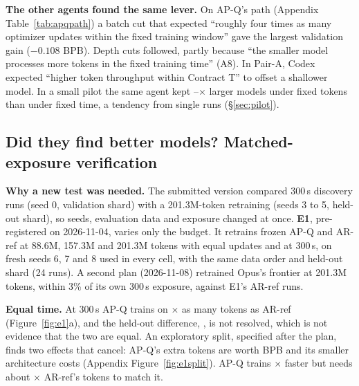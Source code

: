 \documentclass{article}
\begin{document}
\textbf{The other agents found the same lever.} On AP-Q's path (Appendix Table~\ref{tab:apqpath}) a batch cut that expected ``roughly four times as many optimizer updates within the fixed training window'' gave the largest validation gain ($-0.108$ BPB). Depth cuts followed, partly because ``the smaller model processes more tokens in the fixed training time'' (A8). In Pair-A, Codex expected ``higher token throughput within Contract T'' to offset a shallower model. In a small pilot the same agent kept \CRFivePilotRatioLo--\CRFivePilotRatioHi$\times$ larger models under fixed tokens than under fixed time, a tendency from single runs (\S\ref{sec:pilot}).

\subsection{Did they find better models? Matched-exposure verification}\label{sec:verify}
\textbf{Why a new test was needed.} The submitted version compared 300\,s discovery runs (seed 0, validation shard) with a 201.3M-token retraining (seeds 3 to 5, held-out shard), so seeds, evaluation data and exposure changed at once. \textbf{E1}, pre-registered on 2026-11-04, varies only the budget. It retrains frozen AP-Q and AR-ref at 88.6M, 157.3M and 201.3M tokens with equal updates and at 300\,s, on fresh seeds 6, 7 and 8 used in every cell, with the same data order and held-out shard (24 runs). A second plan (2026-11-08) retrained Opus's frontier at 201.3M tokens, within 3\% of its own 300\,s exposure, against E1's AR-ref runs.

\begin{table}[b]
\begin{minipage}[c]{.61\linewidth}\centering\scriptsize\setlength{\tabcolsep}{4pt}\end{minipage}\hfill
\begin{minipage}[c]{.37\linewidth}\label{tab:results}\end{minipage}
\end{table}

\textbf{Equal time.} At 300\,s AP-Q trains on \CREOneTokRatio$\times$ as many tokens as AR-ref (Figure~\ref{fig:e1}a), and the held-out difference, \CREOneTimeHeldThree{} \CREOneTimeHeldCI, is not resolved, which is not evidence that the two are equal. An exploratory split, specified after the plan, finds two effects that cancel: AP-Q's extra tokens are worth \CREOneExposure{} BPB and its smaller architecture costs \CREOneArch{} (Appendix Figure~\ref{fig:e1split}). AP-Q trains \CREOneRho$\times$ faster but needs about \CREOneK$\times$ AR-ref's tokens to match it.
\end{document}

